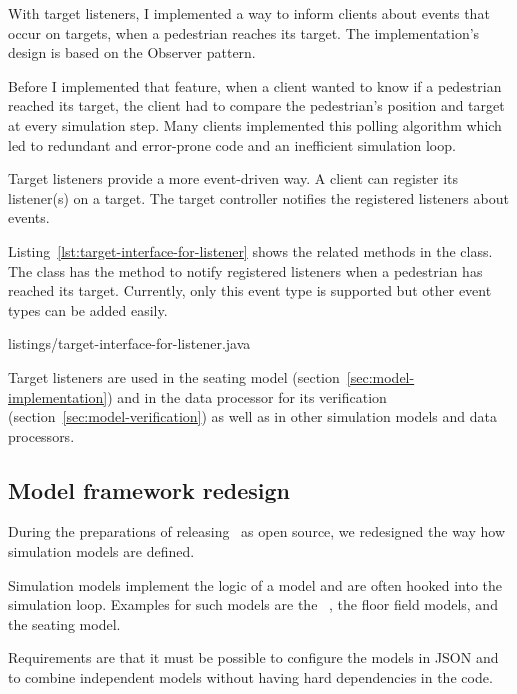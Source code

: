 With target listeners, I implemented a way to inform clients about events that
occur on targets, \eg when a pedestrian reaches its target.
The implementation's design is based on the Observer pattern.

Before I implemented that feature, when a client wanted to know if a pedestrian
reached its target, the client had to compare the pedestrian's position and
target at every simulation step.
Many clients implemented this polling algorithm which led to redundant and
error-prone code and an inefficient simulation loop.

Target listeners provide a more event-driven way.
A client can register its listener(s) on a target.
The target controller notifies the registered listeners about events.

Listing~\ref{lst:target-interface-for-listener} shows the related methods in the
 class.
The  class has the method
 to notify registered listeners when a
pedestrian has reached its target.
Currently, only this event type is supported but other event types can be added
easily.

%
{listings/target-interface-for-listener.java}

Target listeners are used in the seating model
(section~\ref{sec:model-implementation}) and in the data processor for its
verification (section~\ref{sec:model-verification}) as well as in other
simulation models and data processors.

\subsection{Model framework redesign}
\label{sec:simulation-model-framework}

During the preparations of releasing \vadere\ as open source, we redesigned the
way how simulation models are defined.

Simulation models implement the logic of a model and are often hooked into the
simulation loop.
Examples for such models are the \osm\ \citep{seitz-2012,seitz-2016}, the floor
field models, and the seating model.

Requirements are that it must be possible to configure the models in \acs{JSON}
and to combine independent models without having hard dependencies in the code.

